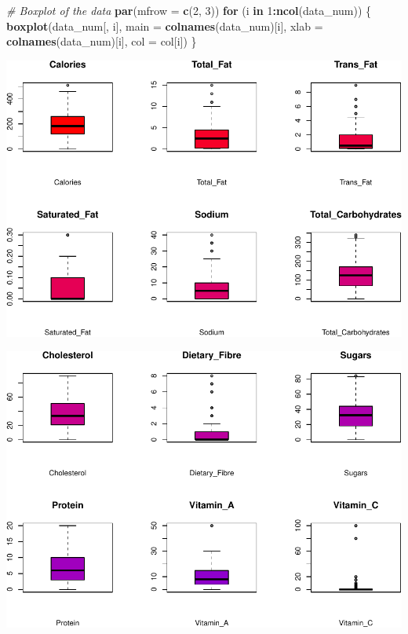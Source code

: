 \documentclass[
]{article}
\newenvironment{Shaded}{\begin{snugshade}}{\end{snugshade}}
\newcommand{\AttributeTok}[1]{\textcolor[rgb]{0.13,0.29,0.53}{#1}}
\newcommand{\CommentTok}[1]{\textcolor[rgb]{0.56,0.35,0.01}{\textit{#1}}}
\newcommand{\ControlFlowTok}[1]{\textcolor[rgb]{0.13,0.29,0.53}{\textbf{#1}}}
\newcommand{\DecValTok}[1]{\textcolor[rgb]{0.00,0.00,0.81}{#1}}
\newcommand{\FunctionTok}[1]{\textcolor[rgb]{0.13,0.29,0.53}{\textbf{#1}}}
\newcommand{\NormalTok}[1]{#1}
\newcommand{\SpecialCharTok}[1]{\textcolor[rgb]{0.81,0.36,0.00}{\textbf{#1}}}
\begin{document}
\begin{Shaded}
\begin{Highlighting}[]
\CommentTok{\# Boxplot of the data}
\FunctionTok{par}\NormalTok{(}\AttributeTok{mfrow =} \FunctionTok{c}\NormalTok{(}\DecValTok{2}\NormalTok{, }\DecValTok{3}\NormalTok{))}
\ControlFlowTok{for}\NormalTok{ (i }\ControlFlowTok{in} \DecValTok{1}\SpecialCharTok{:}\FunctionTok{ncol}\NormalTok{(data\_num)) \{}
  \FunctionTok{boxplot}\NormalTok{(data\_num[, i], }\AttributeTok{main =} \FunctionTok{colnames}\NormalTok{(data\_num)[i],}
          \AttributeTok{xlab =} \FunctionTok{colnames}\NormalTok{(data\_num)[i], }\AttributeTok{col =}\NormalTok{ col[i])}
\NormalTok{\}}
\end{Highlighting}
\end{Shaded}

\begin{center}\includegraphics{Statistical_Learning_Final_Report_files/figure-latex/boxplot-1} \end{center}

\begin{center}\includegraphics{Statistical_Learning_Final_Report_files/figure-latex/boxplot-2} \end{center}
\end{document}
